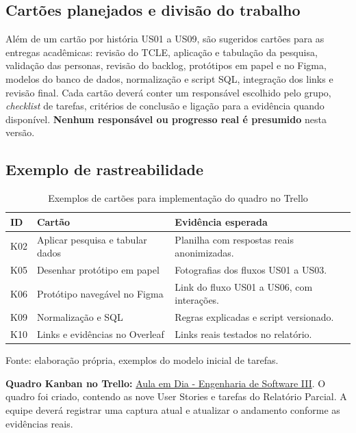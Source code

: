 \documentclass[12pt,a4paper,oneside]{report}
\begin{document}
\subsection{Cartões planejados e divisão do trabalho}
Além de um cartão por história US01 a US09, são sugeridos cartões para as entregas acadêmicas: revisão do TCLE, aplicação e tabulação da pesquisa, validação das personas, revisão do backlog, protótipos em papel e no Figma, modelos do banco de dados, normalização e script SQL, integração dos links e revisão final. Cada cartão deverá conter um responsável escolhido pelo grupo, \textit{checklist} de tarefas, critérios de conclusão e ligação para a evidência quando disponível. \textbf{Nenhum responsável ou progresso real é presumido} nesta versão.

\subsection{Exemplo de rastreabilidade}
\begin{table}[htbp]
\centering
\caption{Exemplos de cartões para implementação do quadro no Trello}
\small
\renewcommand{\arraystretch}{1.2}
\begin{tabularx}{\textwidth}{@{}>{\RaggedRight\arraybackslash}p{1cm}>{\RaggedRight\arraybackslash}p{3.7cm}>{\RaggedRight\arraybackslash}X@{}}
\toprule
\textbf{ID} & \textbf{Cartão} & \textbf{Evidência esperada} \\
\midrule
K02 & Aplicar pesquisa e tabular dados & Planilha com respostas reais anonimizadas. \\
K05 & Desenhar protótipo em papel & Fotografias dos fluxos US01 a US03. \\
K06 & Protótipo navegável no Figma & Link do fluxo US01 a US06, com interações. \\
K09 & Normalização e SQL & Regras explicadas e script versionado. \\
K10 & Links e evidências no Overleaf & Links reais testados no relatório. \\
\bottomrule
\end{tabularx}
\par\smallskip
\begin{minipage}{\textwidth}\footnotesize Fonte: elaboração própria, exemplos do modelo inicial de tarefas.\end{minipage}
\end{table}

\noindent\textbf{Quadro Kanban no Trello:} \href{https://trello.com/b/vuNmlqB8/aula-em-dia-engenharia-de-software-3}{Aula em Dia - Engenharia de Software III}. O quadro foi criado, contendo as nove User Stories e tarefas do Relatório Parcial. A equipe deverá registrar uma captura atual e atualizar o andamento conforme as evidências reais.
\end{document}
